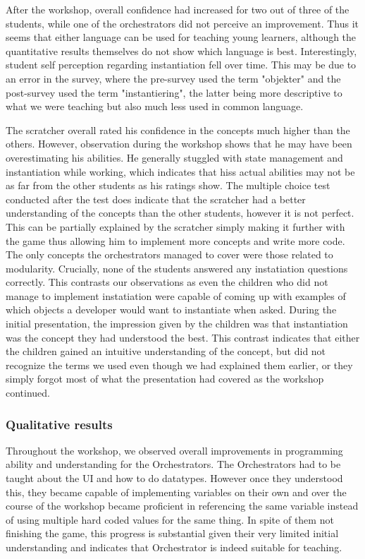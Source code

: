 After the workshop, overall confidence had increased for two out of three of the students, while one of the orchestrators did not perceive an improvement. Thus it seems  that either language can be used for teaching young learners, although the quantitative results themselves do not show which language is best. Interestingly, student self perception regarding instantiation fell over time. This may be due to an error in the survey, where the pre-survey used the term "objekter" and the post-survey used the term "instantiering", the latter being more descriptive to what we were teaching but also much less used in common language. 

The scratcher overall rated his confidence in the concepts much higher than the others. However, observation during the workshop shows that he may have been overestimating his abilities. He generally stuggled with state management and instantiation while working, which indicates that hiss actual abilities may not be as far from the other students as his ratings show. The multiple choice test conducted after the test does indicate that the scratcher had a better understanding of the concepts than the other students, however it is not perfect. This can be partially explained by the scratcher simply making it further with the game thus allowing him to implement more concepts and write more code. The only concepts the orchestrators managed to cover were those related to modularity.  Crucially, none of the students answered any instatiation questions correctly. This contrasts our observations as even the children who did not manage to implement instatiation were capable of coming up with examples of which objects a developer would want to instantiate when asked. During the initial presentation, the impression given by the children was that  instantiation was the concept they had understood the best. This contrast indicates that either the children gained an intuitive understanding of the concept, but did not recognize the terms we used even though we had explained them earlier, or they simply forgot most of what the presentation had covered as the workshop continued.



\subsubsection{Qualitative results}
Throughout the workshop, we observed overall improvements in programming ability and understanding for the Orchestrators.  The Orchestrators had to be taught about the UI and how to do datatypes. However once they understood this, they became capable of implementing variables on their own and over the course of the workshop became proficient in referencing the same variable instead of using multiple hard coded values for the same thing. In spite of them not finishing the game, this progress is substantial given their very limited initial understanding and indicates that Orchestrator is indeed suitable for teaching.

